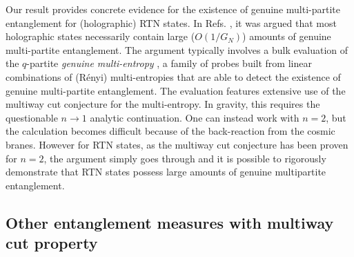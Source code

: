 \documentclass[11pt,oneside,letterpaper]{article}
\numberwithin{equation}{section}
\theoremstyle{definition}
\theoremstyle{remark}
\begin{document}
Our result provides concrete evidence for the existence of genuine multi-partite entanglement for (holographic) RTN states. In Refs. \cite{Iizuka:2025bcc,Iizuka:2025ioc,Iizuka:2025caq}, it was argued that most holographic states necessarily contain large ($O(1/G_N)$) amounts of genuine multi-partite entanglement. The argument typically involves a bulk evaluation of the $q$-partite \emph{genuine multi-entropy} \cite{Iizuka:2025ioc}, a family of probes built from linear combinations of (R\'enyi) multi-entropies that are able to detect the existence of genuine multi-partite entanglement. The evaluation features extensive use of the multiway cut conjecture for the multi-entropy. In gravity, this requires the questionable $n\to1$ analytic continuation. One can instead work with $n=2$, but the calculation becomes difficult because of the back-reaction from the cosmic branes. However for RTN states, as the multiway cut conjecture has been proven for $n=2$, the argument simply goes through and it is possible to rigorously demonstrate that RTN states possess large amounts of genuine multipartite entanglement.


\subsection*{Other entanglement measures with multiway cut property}
\end{document}
